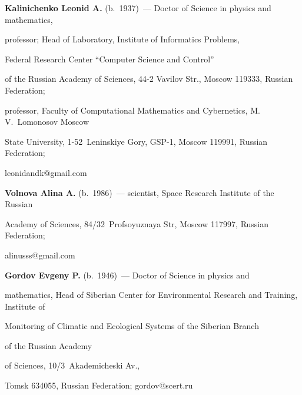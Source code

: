\Contr





\noindent


\textbf{Kalinichenko Leonid A.} (b.\ 1937)~--- Doctor of Science in physics and mathematics, 


professor; Head of Laboratory, Institute of Informatics Problems, 


Federal Research Center ``Computer Science and Control'' 


of the Russian Academy of Sciences, 44-2 Vavilov Str., Moscow 119333, Russian Federation; 


professor, Faculty of Computational Mathematics and Cybernetics, M.\,V.~Lomonosov Moscow 


State University, 1-52~Leninskiye Gory, GSP-1, Moscow 119991, Russian Federation; 


leonidandk@gmail.com 





\vspace*{3pt}





\noindent


\textbf{Volnova Alina A.} (b.\ 1986)~--- scientist, Space Research Institute of the Russian 


Academy of Sciences, 84/32~Profsoyuznaya Str, Moscow 117997, Russian Federation; 


alinusss@gmail.com


       


\vspace*{3pt}





\noindent


       \textbf{Gordov Evgeny P.} (b.\ 1946)~--- Doctor of Science in physics and 


mathematics, Head of Siberian Center for Environmental Research and Training, Institute of 


Monitoring of Climatic and Ecological Systems of the Siberian Branch 


of the Russian Academy 


of Sciences, 10/3~Akademicheski Av., 


Tomsk 634055, Russian Federation; gordov@scert.ru


       


